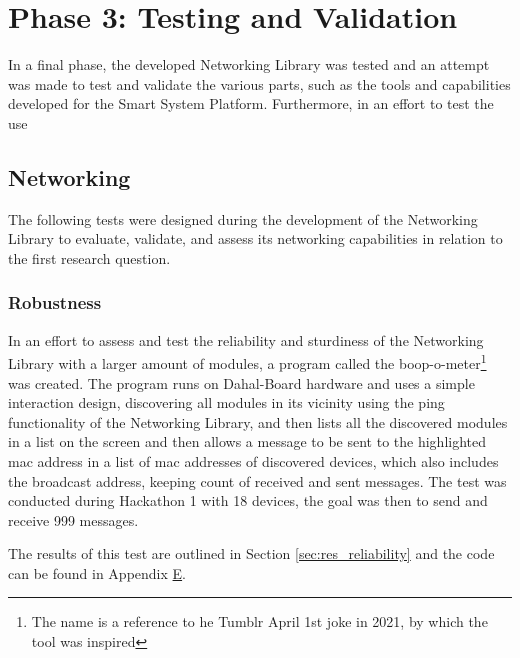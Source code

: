 \section{\label{sec:methods_ph3}Phase 3: Testing and Validation}
In a final phase, the developed Networking Library was tested and an attempt was made to test and validate the various parts, such as the tools and capabilities developed for the Smart System Platform. Furthermore, in an effort to test the use 

\subsection{\label{sec:methods_test_net}Networking}
The following tests were designed during the development of the Networking Library to evaluate, validate, and assess its networking capabilities in relation to the first research question.

\subsubsection{\label{sec:methods_test_boop}Robustness}
In an effort to assess and test the reliability and sturdiness of the Networking Library with a larger amount of modules, a program called the boop-o-meter\footnote{The name is a reference to he Tumblr April 1st joke in 2021, by which the tool was inspired} was created. The program runs on Dahal-Board hardware and uses a simple interaction design, discovering all modules in its vicinity using the ping functionality of the Networking Library, and then lists all the discovered modules in a list on the screen and then allows a message to be sent to the highlighted mac address in a list of mac addresses of discovered devices, which also includes the broadcast address, keeping count of received and sent messages. The test was conducted during Hackathon 1 with 18 devices, the goal was then to send and receive 999 messages.


The results of this test are outlined in Section \ref{sec:res_reliability} and the code can be found in Appendix \hyperref[chap:apx_e]{E}.

